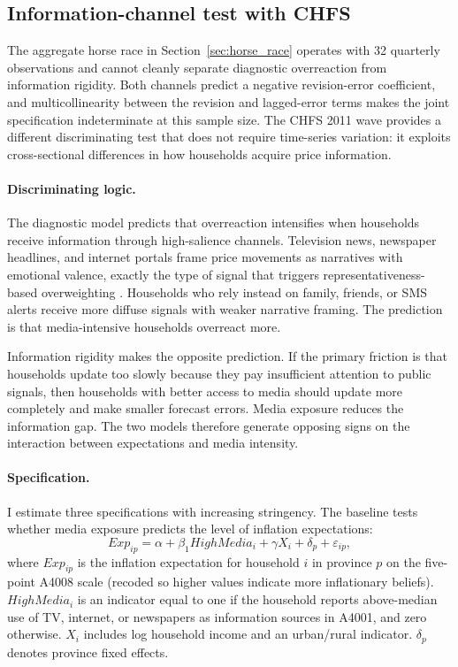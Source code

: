 \subsection{Information-channel test with CHFS}%

The aggregate horse race in Section~\ref{sec:horse_race} operates
with 32 quarterly observations and cannot cleanly separate diagnostic
overreaction from information rigidity. Both channels predict a
negative revision-error coefficient, and multicollinearity between the
revision and lagged-error terms makes the joint specification
indeterminate at this sample size. The CHFS 2011 wave provides a
different discriminating test that does not require time-series
variation: it exploits cross-sectional differences in how households
acquire price information.

\paragraph{Discriminating logic.}
The diagnostic model predicts that overreaction intensifies when
households receive information through high-salience channels.
Television news, newspaper headlines, and internet portals frame price
movements as narratives with emotional valence, exactly the type of
signal that triggers representativeness-based overweighting
\citep{Bordalo2018}. Households who rely instead on family, friends, or
SMS alerts receive more diffuse signals with weaker narrative framing.
The prediction is that media-intensive households overreact more.

Information rigidity makes the opposite prediction. If the primary
friction is that households update too slowly because they pay
insufficient attention to public signals, then households with better
access to media should update more completely and make smaller forecast
errors. Media exposure reduces the information gap. The two models
therefore generate opposing signs on the interaction between
expectations and media intensity.

\paragraph{Specification.}
I estimate three specifications with increasing stringency. The
baseline tests whether media exposure predicts the level of inflation
expectations:
\begin{equation*}%
  Exp_{ip} = \alpha + \beta_1 HighMedia_i
    + \gamma X_i + \delta_p + \varepsilon_{ip},
\end{equation*}
where $Exp_{ip}$ is the inflation expectation for household $i$ in
province $p$ on the five-point A4008 scale (recoded so higher values
indicate more inflationary beliefs). $HighMedia_i$ is an indicator
equal to one if the household reports above-median use of TV, internet,
or newspapers as information sources in A4001, and zero otherwise.
$X_i$ includes log household income and an urban/rural indicator.
$\delta_p$ denotes province fixed effects.

